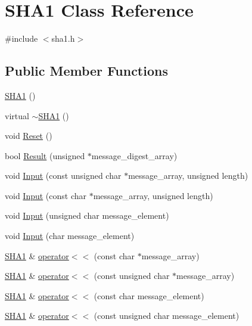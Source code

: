 \hypertarget{classSHA1}{\section{\-S\-H\-A1 \-Class \-Reference}
\label{classSHA1}
}


{\ttfamily \#include $<$sha1.\-h$>$}

\subsection*{\-Public \-Member \-Functions}
\begin{DoxyCompactItemize}
\item 
\hyperlink{classSHA1_ad49a5108ffd6996b1133bf41224ff726}{\-S\-H\-A1} ()
\item 
virtual \hyperlink{classSHA1_a8485d7c14fa29286cd3c7acfe438606d}{$\sim$\-S\-H\-A1} ()
\item 
void \hyperlink{classSHA1_accec3092d91c84d7e71d32c681357119}{\-Reset} ()
\item 
bool \hyperlink{classSHA1_ab374ecf64d54cc133805322370f3b0f1}{\-Result} (unsigned $\ast$message\-\_\-digest\-\_\-array)
\item 
void \hyperlink{classSHA1_a5612d5feb8202a4930aa271df8cbf102}{\-Input} (const unsigned char $\ast$message\-\_\-array, unsigned length)
\item 
void \hyperlink{classSHA1_a0c7555ddc781f3834c0a6218d1edc98e}{\-Input} (const char $\ast$message\-\_\-array, unsigned length)
\item 
void \hyperlink{classSHA1_af4d21901eb9ed48d8f8a16d0ec166829}{\-Input} (unsigned char message\-\_\-element)
\item 
void \hyperlink{classSHA1_a0fb5a35d1bc54e568d8774f966441c41}{\-Input} (char message\-\_\-element)
\item 
\hyperlink{classSHA1}{\-S\-H\-A1} \& \hyperlink{classSHA1_a5d334b9a7847596c51e671ae8fded37b}{operator$<$$<$} (const char $\ast$message\-\_\-array)
\item 
\hyperlink{classSHA1}{\-S\-H\-A1} \& \hyperlink{classSHA1_a4debec5cf6b08eb019c5fddb2f2ec68f}{operator$<$$<$} (const unsigned char $\ast$message\-\_\-array)
\item 
\hyperlink{classSHA1}{\-S\-H\-A1} \& \hyperlink{classSHA1_adfbd48831872d9b54bde3cd3963cfed2}{operator$<$$<$} (const char message\-\_\-element)
\item 
\hyperlink{classSHA1}{\-S\-H\-A1} \& \hyperlink{classSHA1_a52d73d41b7fc85895aadb8cea3b822ab}{operator$<$$<$} (const unsigned char message\-\_\-element)
\end{DoxyCompactItemize}

